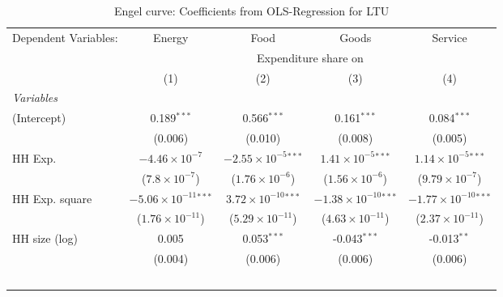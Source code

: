 
\begin{table}[htbp!]
   \centering
   \small
   \begin{adjustbox}{width = 1\textwidth, max height = 0.95\textheight, center}
      \begin{threeparttable}[b]
         \caption{\label{tab:Engel_parametric_LTU} Engel curve: Coefficients from OLS-Regression for LTU}
         \begin{tabular}{lcccc}
            \tabularnewline \midrule \midrule
            Dependent Variables: & Energy                          & Food                           & Goods                           & Service\\  
             & \multicolumn{4}{c}{Expenditure share on} \\ 
                                 & (1)                             & (2)                            & (3)                             & (4)\\  
            \midrule
            \emph{Variables}\\
            (Intercept)          & 0.189$^{***}$                   & 0.566$^{***}$                  & 0.161$^{***}$                   & 0.084$^{***}$\\   
                                 & (0.006)                         & (0.010)                        & (0.008)                         & (0.005)\\   
            HH Exp.              & $-4.46\times 10^{-7}$           & $-2.55\times 10^{-5}$$^{***}$  & $1.41\times 10^{-5}$$^{***}$    & $1.14\times 10^{-5}$$^{***}$\\    
                                 & ($7.8\times 10^{-7}$)           & ($1.76\times 10^{-6}$)         & ($1.56\times 10^{-6}$)          & ($9.79\times 10^{-7}$)\\    
            HH Exp. square       & $-5.06\times 10^{-11}$$^{***}$  & $3.72\times 10^{-10}$$^{***}$  & $-1.38\times 10^{-10}$$^{***}$  & $-1.77\times 10^{-10}$$^{***}$\\    
                                 & ($1.76\times 10^{-11}$)         & ($5.29\times 10^{-11}$)        & ($4.63\times 10^{-11}$)         & ($2.37\times 10^{-11}$)\\    
            HH size (log)        & 0.005                           & 0.053$^{***}$                  & -0.043$^{***}$                  & -0.013$^{**}$\\   
                                 & (0.004)                         & (0.006)                        & (0.006)                         & (0.006)\\   
$$
\end{tabular}
\end{threeparttable}
\end{adjustbox}
\end{table}
